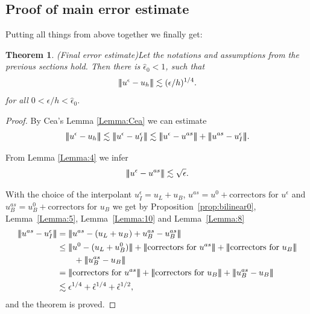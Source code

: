 \documentclass{article}
\newcommand{\vvvert}{\ensuremath|\!|\!|\xspace}
\newtheorem{thm}{Theorem}
\newcommand{\ueps}{u^\epsilon}
\newcommand{\uas}{u^{as}}
\newcommand{\uBas}{\ensuremath{u_B^{as}}\xspace}
\begin{document}
\subsection{Proof of main error estimate}

Putting all things from above together we finally get:

\begin{thm}(Final error estimate)\label{Thm:final error estimate}
Let the notations and assumptions from the previous sections hold. 
Then there is $\hat{\epsilon}_0<1$, such that
$$
\vvvert \ueps - u_h\vvvert  \lesssim (\epsilon/h)^{1/4}.
$$
for all $0< \epsilon/h < \hat{\epsilon}_0.$
\end{thm}

\begin{proof}
By Cea's Lemma \ref{Lemma:Cea} we can estimate
$$
\vvvert \ueps - u_h\vvvert  \lesssim \vvvert \ueps - \ueps_I \vvvert  \lesssim  \vvvert  \ueps - \uas\vvvert  + \vvvert  \uas - \ueps_I\vvvert.
$$

From Lemma \ref{Lemma:4} we infer
$$
\vvvert  \ueps - \uas\vvvert  \lesssim \sqrt{\epsilon}.
$$

With the choice of the interpolant $\ueps_I = u_L + u_B$, $\uas = u^0 + \text{correctors for } \ueps$  and $\uBas = u_B^0 + \text{correctors for } u_B$
we get by Proposition~\ref{prop:bilinear0}, Lemma~\ref{Lemma:5}, Lemma~\ref{Lemma:10} and Lemma~\ref{Lemma:8}
$$
\begin{aligned}
\vvvert  \uas - \ueps_I\vvvert &=  \vvvert \uas - (u_L + u_B) +\uBas - \uBas\vvvert  \\
       & \leq \vvvert u^0 - (u_L + u_B^0)\vvvert   + \vvvert \text{correctors for }\uas\vvvert  + \vvvert \text{correctors for }u_B\vvvert  \\
       &\qquad + \vvvert u_B^{as} - u_B\vvvert \\
          &= \vvvert \text{correctors for }\uas\vvvert  + \vvvert \text{correctors for }u_B\vvvert  +
      \vvvert u_B^{as} - u_B\vvvert \\
    &\lesssim 
    \epsilon^{1/4} + \hat{\epsilon}^{1/4} + \hat{\epsilon}^{1/2},
\end{aligned}
$$
and the theorem is proved.
\end{proof}
\end{document}
